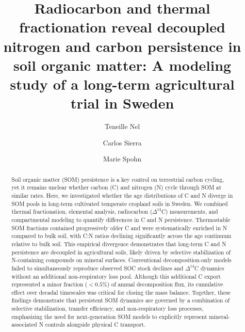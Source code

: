 \documentclass[bg, manuscript]{copernicus}
\begin{document}
\title{Radiocarbon and thermal fractionation reveal decoupled nitrogen and carbon persistence in soil organic matter: A modeling study of a long-term agricultural trial in Sweden}


\author[1]{Teneille Nel}
\author[2]{Carlos Sierra}
\author[3]{Marie Spohn}




\received{}
\pubdiscuss{} %
\revised{}
\accepted{}
\published{}




\maketitle



\begin{abstract}
Soil organic matter (SOM) persistence is a key control on terrestrial carbon cycling, yet it remains unclear whether carbon (C) and nitrogen (N) cycle through SOM at similar rates. Here, we investigated whether the age distributions of C and N diverge in SOM pools in long-term cultivated temperate cropland soils in Sweden. We combined thermal fractionation, elemental analysis, radiocarbon ($\Delta^{14}$C) measurements, and compartmental modeling to quantify differences in C and N persistence. Thermostable SOM fractions contained progressively older C and were systematically enriched in N compared to bulk soil, with C:N ratios declining significantly across the age continuum relative to bulk soil. This empirical divergence demonstrates that long-term C and N persistence are decoupled in agricultural soils, likely driven by selective stabilization of N-containing compounds on mineral surfaces. Conventional decomposition-only models failed to simultaneously reproduce observed SOC stock declines and $\Delta^{14}$C dynamics without an additional non-respiratory loss pool. Although this additional C export represented a minor fraction ($< 0.5\%$) of annual decomposition flux, its cumulative effect over decadal timescales was critical for closing the mass balance. Together, these findings demonstrate that persistent SOM dynamics are governed by a combination of selective stabilization, transfer efficiency, and non-respiratory loss processes, emphasizing the need for next-generation SOM models to explicitly represent mineral-associated N controls alongside physical C transport.
\end{abstract}
\end{document}
